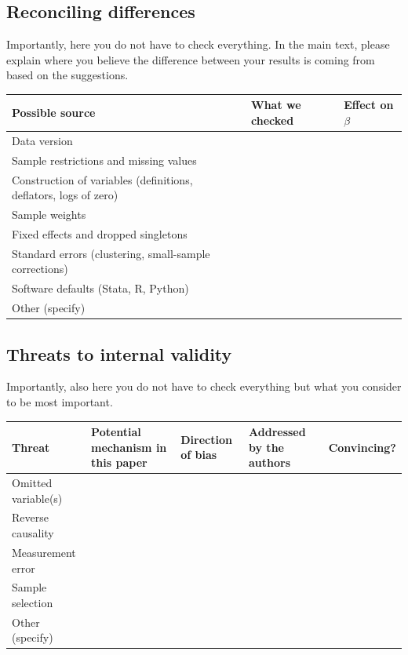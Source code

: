 \documentclass[12pt,a4paper]{article}
\renewcommand{\arraystretch}{1.25}
\begin{document}
\subsection{Reconciling differences}

Importantly, here you do not have to check everything. In the main text, please explain where you believe the difference between your results is coming from based on the suggestions.

{\renewcommand{\arraystretch}{1.4}%
\begin{tabularx}{\textwidth}{@{}>{\raggedright\arraybackslash}p{}L>{\raggedright\arraybackslash}p{0.15\textwidth}@{}}
\toprule
Possible source & What we checked & Effect on $\beta$ \\
\midrule
Data version & & \\
Sample restrictions and missing values & & \\
Construction of variables (definitions, deflators, logs of zero) & & \\
Sample weights & & \\
Fixed effects and dropped singletons & & \\
Standard errors (clustering, small-sample corrections) & & \\
Software defaults (Stata, R, Python) & & \\
Other (specify) & & \\
\bottomrule
\end{tabularx}}

\subsection{Threats to internal validity}

Importantly, also here you do not have to check everything but what you consider to be most important.

{\renewcommand{\arraystretch}{1.4}%
\begin{tabularx}{\textwidth}{@{}>{\raggedright\arraybackslash}p{}
  L
  >{\raggedright\arraybackslash}p{0.13\textwidth}
  L
  >{\raggedright\arraybackslash}p{0.14\textwidth}@{}}
\toprule
Threat & Potential mechanism in this paper & Direction of bias & Addressed by the authors & Convincing? \\
\midrule
Omitted variable(s) & & & & \\
Reverse causality & & & & \\
Measurement error & & & & \\
Sample selection & & & & \\
Other (specify) & & & & \\
\bottomrule
\end{tabularx}}
\end{document}
